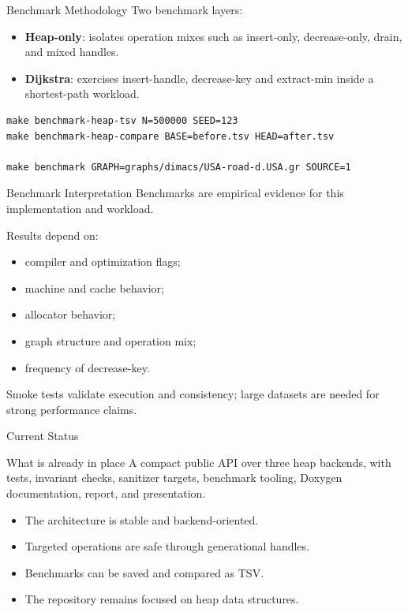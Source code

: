\documentclass[10pt,aspectratio=43]{beamer}
\begin{document}
\begin{frame}[fragile]{Benchmark Methodology}
    Two benchmark layers:

    \begin{itemize}
        \item \textbf{Heap-only}: isolates operation mixes such as insert-only, decrease-only, drain, and mixed handles.
        \item \textbf{Dijkstra}: exercises insert-handle, decrease-key and extract-min inside a shortest-path workload.
    \end{itemize}

    \vspace{0.4em}
    \begin{lstlisting}[style=shellstyle]
make benchmark-heap-tsv N=500000 SEED=123
make benchmark-heap-compare BASE=before.tsv HEAD=after.tsv

make benchmark GRAPH=graphs/dimacs/USA-road-d.USA.gr SOURCE=1
    \end{lstlisting}
\end{frame}

\begin{frame}{Benchmark Interpretation}
    Benchmarks are empirical evidence for this implementation and workload.

    \vspace{0.4em}
    Results depend on:
    \begin{itemize}
        \item compiler and optimization flags;
        \item machine and cache behavior;
        \item allocator behavior;
        \item graph structure and operation mix;
        \item frequency of decrease-key.
    \end{itemize}

    \vspace{0.4em}
    Smoke tests validate execution and consistency; large datasets are needed for strong performance claims.
\end{frame}

\begin{frame}{Current Status}
    \begin{block}{What is already in place}
        A compact public API over three heap backends, with tests, invariant checks, sanitizer targets, benchmark tooling, Doxygen documentation, report, and presentation.
    \end{block}

    \vspace{0.5em}
    \begin{itemize}
        \item The architecture is stable and backend-oriented.
        \item Targeted operations are safe through generational handles.
        \item Benchmarks can be saved and compared as TSV.
        \item The repository remains focused on heap data structures.
    \end{itemize}
\end{frame}
\end{document}
